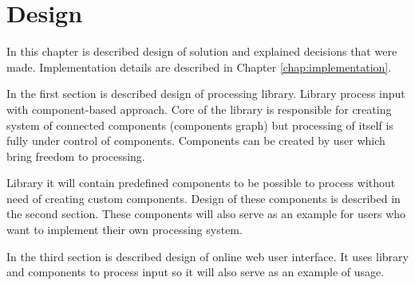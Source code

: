 
\chapter{Design}

In this chapter is described design of solution and explained decisions that were made.
Implementation details are described in Chapter \ref{chap:implementation}.

In the first section is described design of \lsystem processing library.
Library process input with component-based approach.
Core of the library is responsible for creating system of connected components (components graph) but processing of \lsystem itself is fully under control of components.
Components can be created by user which bring freedom to \lsystem processing.

Library it will contain predefined components to be possible to process \lsystems without need of creating custom components.
Design of these components is described in the second section.
These components will also serve as an example for users who want to implement their own processing system.

In the third section is described design of online web user interface.
It uses library and components to process input so it will also serve as an example of usage.






%

















